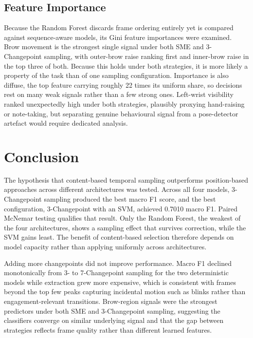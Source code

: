\documentclass[11pt,a4paper]{article}
\begin{document}
\subsection{Feature Importance}

Because the Random Forest discards frame ordering entirely yet is compared against sequence-aware models, its Gini feature importances were examined. Brow movement is the strongest single signal under both SME and 3-Changepoint sampling, with outer-brow raise ranking first and inner-brow raise in the top three of both. Because this holds under both strategies, it is more likely a property of the task than of one sampling configuration. Importance is also diffuse, the top feature carrying roughly 22 times its uniform share, so decisions rest on many weak signals rather than a few strong ones. Left-wrist visibility ranked unexpectedly high under both strategies, plausibly proxying hand-raising or note-taking, but separating genuine behavioural signal from a pose-detector artefact would require dedicated analysis.

\section{Conclusion}

The hypothesis that content-based temporal sampling outperforms position-based approaches across different architectures was tested. Across all four models, 3-Changepoint sampling produced the best macro F1 score, and the best configuration, 3-Changepoint with an SVM, achieved 0.7010 macro F1. Paired McNemar testing qualifies that result. Only the Random Forest, the weakest of the four architectures, shows a sampling effect that survives correction, while the SVM gains least. The benefit of content-based selection therefore depends on model capacity rather than applying uniformly across architectures.

Adding more changepoints did not improve performance. Macro F1 declined monotonically from 3- to 7-Changepoint sampling for the two deterministic models while extraction grew more expensive, which is consistent with frames beyond the top few peaks capturing incidental motion such as blinks rather than engagement-relevant transitions. Brow-region signals were the strongest predictors under both SME and 3-Changepoint sampling, suggesting the classifiers converge on similar underlying signal and that the gap between strategies reflects frame quality rather than different learned features.
\end{document}
